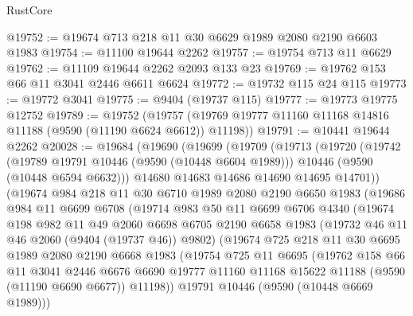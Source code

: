\begin{lexlean}{RustCore}
\begin{coremodule}
@19752 := @19674 @713 @218 @11 @30 @6629 @1989 @2080 @2190 @6603 @1983
@19754 := @11100 @19644 @2262
@19757 := @19754 @713 @11 @6629
@19762 := @11109 @19644 @2262 @2093 @133 @23
@19769 := @19762 @153 @66 @11 @3041 @2446 @6611 @6624
@19772 := @19732 @115 @24 @115
@19773 := @19772 @3041
@19775 := @9404 (@19737 @115)
@19777 := @19773 @19775 @12752
@19789 := @19752
    (@19757 (@19769 @19777 @11160 @11168 @14816 @11188 (@9590 (@11190 @6624 @6612)) @11198))
@19791 := @10441 @19644 @2262
@20028 := @19684
    (@19690
      (@19699
        (@19709
          (@19713
            (@19720
              (@19742
                (@19789 @19791 @10446 (@9590 (@10448 @6604 @1989)))
                @10446
                (@9590 (@10448 @6594 @6632)))
              @14680
              @14683
              @14686
              @14690
              @14695
              @14701))
          (@19674
            @984
            @218
            @11
            @30
            @6710
            @1989
            @2080
            @2190
            @6650
            @1983
            (@19686
              @984
              @11
              @6699
              @6708
              (@19714
                @983
                @50
                @11
                @6699
                @6706
                @4340
                (@19674
                  @198
                  @982
                  @11
                  @49
                  @2060
                  @6698
                  @6705
                  @2190
                  @6658
                  @1983
                  (@19732 @46 @11 @46 @2060 (@9404 (@19737 @46)) @9802)
                  (@19674
                    @725
                    @218
                    @11
                    @30
                    @6695
                    @1989
                    @2080
                    @2190
                    @6668
                    @1983
                    (@19754
                      @725
                      @11
                      @6695
                      (@19762
                        @158
                        @66
                        @11
                        @3041
                        @2446
                        @6676
                        @6690
                        @19777
                        @11160
                        @11168
                        @15622
                        @11188
                        (@9590 (@11190 @6690 @6677))
                        @11198))
                    @19791
                    @10446
                    (@9590 (@10448 @6669 @1989)))

\end{coremodule}
\end{lexlean}
